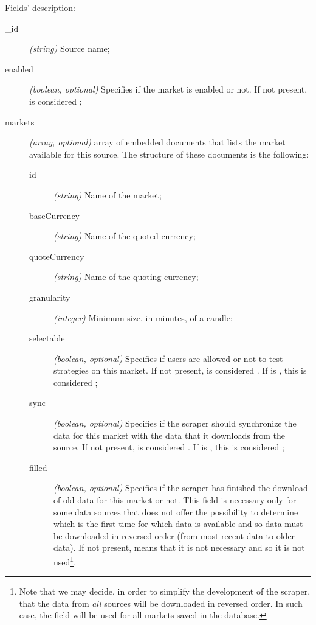 Fields' description:
\begin{description}
	\item[\_id] \textit{(string)} Source name;
	\item[enabled] \textit{(boolean, optional)} Specifies if the market is
		enabled or not. If not present, is considered ;
	\item[markets] \textit{(array, optional)} array of embedded documents
		that lists the market available for this source. The structure
		of these documents is the following:
		\begin{description}
			\item[id] \textit{(string)} Name of the market;
			\item[baseCurrency] \textit{(string)} Name of the quoted
				currency;
			\item[quoteCurrency] \textit{(string)} Name of the
				quoting currency;
			\item[granularity] \textit{(integer)} Minimum size,
				in minutes, of a candle;
			\item[selectable] \textit{(boolean, optional)} Specifies
				if users are allowed or not to test strategies
				on this market. If not present, is considered
				. If  is ,
				this is considered ;
			\item[sync] \textit{(boolean, optional)} Specifies if
				the scraper should synchronize the data for this
				market with the data that it downloads from the
				source. If not present, is considered
				. If  is ,
				this is considered ;
			\item[filled] \textit{(boolean, optional)} Specifies if
				the scraper has finished the download of old
				data for this market or not. This field is
				necessary only for some data sources
				 that does not offer the
				possibility to determine which is the first time
				for which data is available and so data must be
				downloaded in reversed order (from most recent
				data to older data). If not present, means that
				it is not necessary and so it is not
				used\footnote{Note that we may decide, in order
					to simplify the development of the
					scraper, that the data from \emph{all}
					sources will be downloaded in reversed
					order. In such case, the 
					field will be used for all markets saved
					in the database.}.
		\end{description}
\end{description}

